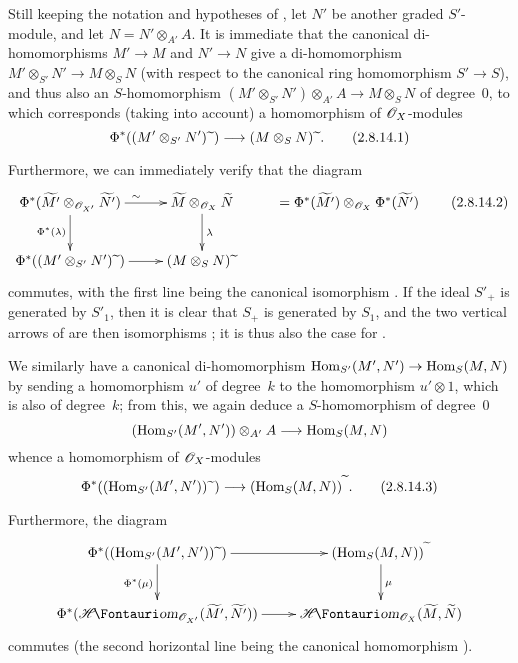 \begin{env}[2.8.14]
\label{II.2.8.14}
Still keeping the notation and hypotheses of , let $N'$ be another graded $S'$-module, and let $N=N'\otimes_{A'}A$.
It is immediate that the canonical di-homomorphisms $M'\to M$ and $N'\to N$ give a di-homomorphism $M'\otimes_{S'}N'\to M\otimes_S N$ (with respect to the canonical ring homomorphism $S'\to S$), and thus also an $S$-homomorphism $(M'\otimes_{S'}N')\otimes_{A'}A\to M\otimes_S N$ of degree~$0$, to which corresponds (taking  into account) a homomorphism of $\mathscr{O}_X$-modules
\[
\label{II.2.8.14.1}
  \Phi^*((M'\otimes_{S'}N')\supertilde) \to (M\otimes_S N)\supertilde.
\tag{2.8.14.1}
\]

Furthermore, we can immediately verify that the diagram
\[
\label{II.2.8.14.2}
  \xymatrix{
    \Phi^*(\widetilde{M'}\otimes_{\sh{O}_{X'}}\widetilde{N'}) \ar[r]^\sim \ar[d]_{\Phi^*(\lambda)}
    & \widetilde{M}\otimes_{\sh{O}_X}\widetilde{N} \ar[d]^\lambda
    & =\Phi^*(\widetilde{M'})\otimes_{\sh{O}_X}\Phi^*(\widetilde{N'})
  \\\Phi^*((M'\otimes_{S'}N')\supertilde) \ar[r]
    & (M\otimes_S N)\supertilde
  }
\tag{2.8.14.2}
\]
commutes, with the first line being the canonical isomorphism .
If the ideal $S'_+$ is generated by $S'_1$, then it is clear that $S_+$ is generated by $S_1$, and the two vertical arrows of  are then isomorphisms ;
it is thus also the case for .

We similarly have a canonical di-homomorphism $\Hom_{S'}(M',N')\to\Hom_S(M,N)$ by sending a homomorphism $u'$ of degree~$k$ to the homomorphism $u'\otimes1$, which is also of degree~$k$;
from this, we again deduce a $S$-homomorphism of degree~$0$
\[
  (\Hom_{S'}(M',N'))\otimes_{A'}A \to \Hom_S(M,N)
\]
whence a homomorphism of $\mathscr{O}_X$-modules
\[
\label{II.2.8.14.3}
  \Phi^*((\Hom_{S'}(M',N'))\supertilde) \to (\Hom_S(M,N))^\supertilde.
\tag{2.8.14.3}
\]

Furthermore, the diagram
\[
  \xymatrix{
    \Phi^*((\Hom_{S'}(M',N'))\supertilde) \ar[r] \ar[d]_{\Phi^*(\mu)}
    & (\Hom_S(M,N))^\supertilde \ar[d]^\mu
  \\\Phi^*(\shHom_{\sh{O}_{X'}}(\widetilde{M'},\widetilde{N'})) \ar[r]
    & \shHom_{\sh{O}_X}(\widetilde{M},\widetilde{N})
  }
\]
commutes (the second horizontal line being the canonical homomorphism ).
\end{env}


